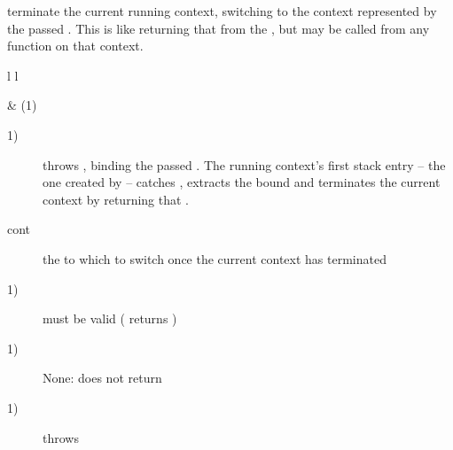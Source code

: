 
terminate the current running context, switching to the context represented by
the passed \cont. This is like returning that \cont from the \entryfn, but may
be called from any function on that context.

\begin{tabular}{ l l }
    \midrule

     & (1)\\

    \midrule
\end{tabular}

\begin{description}
    \item[1)] throws \unwindex, binding the passed \cont. The running
              context's first stack entry -- the one created by \callcc --
              catches \unwindex, extracts the bound \cont and terminates the
              current context by returning that \cont.
\end{description}

\begin{description}
    \item[cont] the \cont to which to switch once the current context has terminated
\end{description}

\begin{description}
    \item[1)]  must be valid ( returns )
\end{description}

\begin{description}
    \item[1)] None: \unwindcont does not return
\end{description}

\begin{description}
    \item[1)] throws \unwindex
\end{description}
